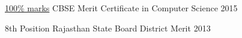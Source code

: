 



\begin{cvhonors}

   \cvhonor
	{\href{https://drive.google.com/file/d/1TZ77jZk_aL1FBOhYcL7RkG_ScscPdFkn/view?usp=sharing}{100\% marks}} %
	{CBSE Merit Certificate in Computer Science} %
	{} %
	{2015} %

  \cvhonor
    {8th Position} %
    {Rajasthan State Board District Merit} %
    {} %
    {2013} %

  
\end{cvhonors}





  
